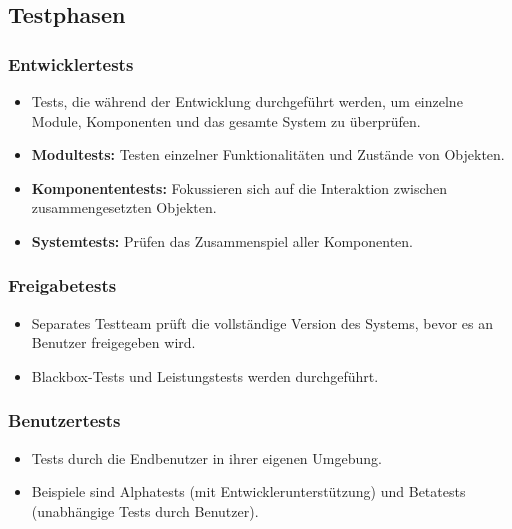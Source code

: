 \documentclass[11pt, a4paper]{article}
\begin{document}
\subsection{Testphasen}

\subsubsection{Entwicklertests}
\begin{itemize}
    \item Tests, die während der Entwicklung durchgeführt werden, um einzelne Module, Komponenten und das gesamte System zu überprüfen.
    \item \textbf{Modultests:} Testen einzelner Funktionalitäten und Zustände von Objekten.
    \item \textbf{Komponententests:} Fokussieren sich auf die Interaktion zwischen zusammengesetzten Objekten.
    \item \textbf{Systemtests:} Prüfen das Zusammenspiel aller Komponenten.
\end{itemize}

\subsubsection{Freigabetests}
\begin{itemize}
    \item Separates Testteam prüft die vollständige Version des Systems, bevor es an Benutzer freigegeben wird.
    \item Blackbox-Tests und Leistungstests werden durchgeführt.
\end{itemize}

\subsubsection{Benutzertests}
\begin{itemize}
    \item Tests durch die Endbenutzer in ihrer eigenen Umgebung.
    \item Beispiele sind Alphatests (mit Entwicklerunterstützung) und Betatests (unabhängige Tests durch Benutzer).
\end{itemize}
\end{document}
